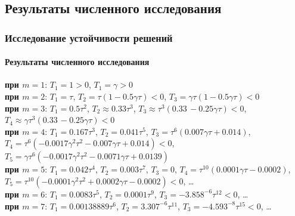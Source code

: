 \documentclass{beamer}
\numberwithin{equation}{section}
\begin{document}
    \subsection{Результаты численного исследования}
    \begin{frame}
        \frametitle{Исследование устойчивости решений}
        \framesubtitle{Результаты численного исследования}

        \begin{small}

        \textbf{при $m=1$}: $T_1 = 1 > 0$, $T_1 = \gamma > 0$\\

        \textbf{при $m=2$}: $T_1 = \tau$, $T_2 = \tau (1 - 0.5 \gamma \tau) < 0$, $T_3 = \gamma \tau (1 - 0.5 \gamma \tau) < 0$\\

        \textbf{при $m=3$}: $T_1 = 0.5 \tau ^2$, $T_2 \approx 0.33 \tau ^3$, $T_3 \approx \tau ^3 (0.33\, -0.25 \gamma  \tau ) < 0$, $T_4 \approx \gamma  \tau ^3 (0.33\, -0.25 \gamma  \tau ) < 0$\\

        \textbf{при $m=4$}: $T_1 = 0.167 \tau ^3$, $T_2 = 0.041 \tau ^5$, $T_3 = \tau ^6 (0.007 \gamma  \tau + 0.014)$, \\$T_4 = \tau ^6 \left(-0.0017 \gamma ^2 \tau ^2-0.007 \gamma  \tau +0.014\right) < 0$, $T_5 = \gamma  \tau ^6 \left(-0.0017 \gamma ^2 \tau ^2-0.0071 \gamma  \tau +0.0139 \right)$\\

        \textbf{при $m=5$}: $T_1 = 0.042 \tau ^4$, $T_2 = 0.003 \tau ^7$, $T_3 = 0$, $T_4 = \tau ^{10} (0.0001 \gamma  \tau -0.0002)$, $T_5 = \tau ^{10} \left(-0.0001 \gamma ^2 \tau ^2+0.0002 \gamma  \tau -0.0002\right) < 0$, \dots\\

        \textbf{при $m=6$}: $T_1 = 0.0083 \tau ^5$, $T_2 = 0.0001 \tau ^9$, $T_3 = -3.858^{-6} \tau ^{12} < 0$, \dots\\

        \textbf{при $m=7$}: $T_1 = 0.00138889 \tau ^6$, $T_2 = 3.307^{-6} \tau ^{11}$, $T_3 = -4.593^{-8} \tau ^{15} < 0$, \dots\\

        \end{small}

    \end{frame}
\end{document}
